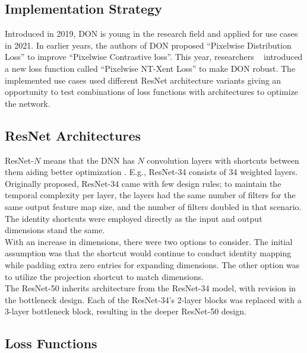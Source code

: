 \subsection{Implementation Strategy}

Introduced in 2019, \ac{DON} is young in the research field and applied for use cases in 2021.
In earlier years, the authors of \ac{DON} proposed ``Pixelwise Distribution Loss'' to improve ``Pixelwise Contrastive loss''. This year,
researchers \citeauthor{adrian2022efficient}~\cite{adrian2022efficient} introduced a new loss function called ``Pixelwise NT-Xent Loss'' to make \ac{DON} robust.
The implemented use cases \parencites{rope-manipulation}{block-manipulation}{florence2019self} used different \ac{ResNet} architecture variants
giving an opportunity to test combinations of loss functions with architectures to optimize the network.



\subsection{ResNet Architectures}
\ac{ResNet}-$N$ means that the \ac{DNN} has $N$ convolution layers with shortcuts between them aiding better optimization \cite{resnet}.
E.g., \ac{ResNet}-34 consists of 34 weighted layers. Originally proposed, \ac{ResNet}-34 came with few design rules; to maintain the temporal complexity per layer, the layers had the same number of
filters for the same output feature map size, and the number of filters doubled in that scenario.
The identity shortcuts were employed directly as the input and output dimensions stand the same.\\

With an increase in dimensions, there were two options to consider.
The initial assumption was that the shortcut would continue to conduct identity mapping while padding extra zero entries for expanding dimensions.
The other option was to utilize the projection shortcut to match dimensions.\\

The \ac{ResNet}-50 inherits architecture from the \ac{ResNet}-34 model, with revision in the bottleneck design.
Each of the \ac{ResNet}-34's 2-layer blocks was replaced with a 3-layer bottleneck block, resulting in the deeper \ac{ResNet}-50 design.



\subsection{Loss Functions}


